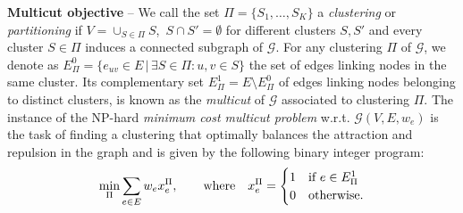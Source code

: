 \textbf{Multicut objective} -- We call the set $\Pi=\{S_1,\ldots,S_K\}$ a \emph{clustering} or \emph{partitioning} if $V = \cup_{S\in\Pi} S $, $\,S \cap S' = \emptyset$ for different clusters $S, S'$ and every cluster $S \in \Pi$ induces a connected subgraph of $\mathcal{G}$. 
For any clustering $\Pi$ of $\mathcal{G}$, we denote as $E^0_\Pi= \{ e_{uv} \in E \,|\, \exists S \in \Pi : u,v \in S \}$ the set of edges linking nodes in the same cluster. Its complementary set $E_\Pi^1= E \setminus E^0_\Pi$ of edges linking nodes belonging to distinct clusters, is known as the \emph{multicut} of $\mathcal{G}$ associated to clustering $\Pi$. The instance of the NP-hard \emph{minimum cost multicut problem} w.r.t. $\mathcal{G}(V,E,w_e)$ is the task of finding a clustering that optimally balances the attraction and repulsion in the graph and is given by the following binary integer program:
\begin{equation}\label{eq:MC_objective}
 \min_\Pi \sum_{e\in E} w_e x_e^\Pi,  \qquad \text{where} \quad x^\Pi_e = 
 \begin{cases} 
 1 & \text{if } e\in E^1_\Pi \\
 0 & \text{otherwise}.
 \end{cases}
\end{equation}


